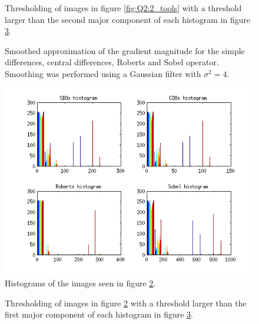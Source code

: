 \begin{figure}[H]
	\centering
	\scalebox{0.9}{}
	\caption{Thresholding of images in figure \ref{fig:Q2:2_tools} with a threshold larger than the second major component of 
	each histogram in figure \ref{fig:Q2:histogram_tools}.}
	\label{fig:Q2:threshold_tools_2}
\end{figure}


\begin{figure}[H]
	\centering
	\scalebox{0.7}{}
	\caption{Smoothed approximation of the gradient magnitude for the simple differences, central differences, Roberts and Sobel operator. Smoothing
	was performed using a Gaussian filter with $\sigma^2 = 4$.}
	\label{fig:Q2:2_tools_smoothed}
\end{figure}

\begin{figure}[H]
	\centering
	\includegraphics[scale=0.8]{./images/Q2/tools_smoothed/histogram_1.png}
	\caption{Histograms of the images seen in figure \ref{fig:Q2:2_tools_smoothed}.}
	\label{fig:Q2:histogram_tools}
\end{figure}


\begin{figure}[H]
	\centering
	\scalebox{0.9}{}
	\caption{Thresholding of images in figure \ref{fig:Q2:2_tools_smoothed} with a threshold larger than the first major component of 
	each histogram in figure \ref{fig:Q2:histogram_tools}.}
	\label{fig:Q2:threshold_tools_smoothed_1}
\end{figure}

